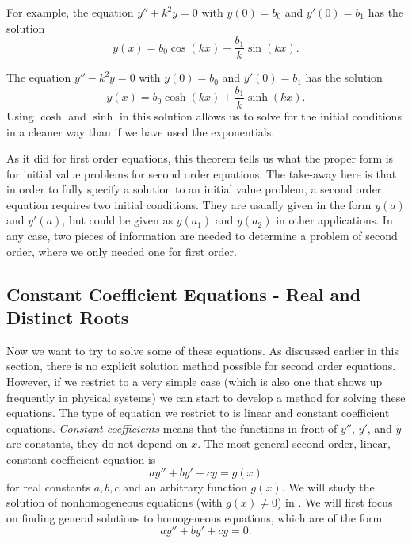 For example, the equation $y'' + k^2 y = 0$ with $y(0) = b_0$ and $y'(0) = b_1$
has the solution
\begin{equation*}
y(x) = b_0 \cos (kx) + \frac{b_1}{k} \sin (kx) .
\end{equation*}

The equation $y'' - k^2 y = 0$ with $y(0) = b_0$ and $y'(0) = b_1$
has the solution
\begin{equation*}
y(x) = b_0 \cosh (kx) + \frac{b_1}{k} \sinh (kx) .
\end{equation*}
Using $\cosh$ and $\sinh$ in this solution allows us to solve for
the initial conditions
in a cleaner way
than if we have used the exponentials.

As it did for first order equations, this theorem tells us what the proper form is for initial value problems for second order equations. The take-away here is that in order to fully specify a solution to an initial value problem, a second order equation requires two initial conditions. They are usually given in the form $y(a)$ and $y'(a)$, but could be given as $y(a_1)$ and $y(a_2)$ in other applications. In any case, two pieces of information are needed to determine a problem of second order, where we only needed one for first order. 

\medskip

\subsection{Constant Coefficient Equations - Real and Distinct Roots}

Now we want to try to solve some of these equations. As discussed earlier in this section, there is no explicit solution method possible for second order equations. However, if we restrict to a very simple case (which is also one that shows up frequently in physical systems) we can start to develop a method for solving these equations. The type of equation we restrict to is linear and constant coefficient equations.  \emph{Constant coefficients}
means that the functions 
in front of $y''$, $y'$, and $y$ are constants, they do not depend on $x$. The most general second order, linear, constant coefficient equation is
\begin{equation*}
ay'' + by' + cy = g(x)
\end{equation*}
for real constants $a, b, c$ and an arbitrary function $g(x)$. We will study the solution of nonhomogeneous equations (with $g(x) \neq 0$) in
.  We will first focus on finding general solutions to
homogeneous equations, which are of the form
\begin{equation*}
ay'' + by' + cy = 0.
\end{equation*}

